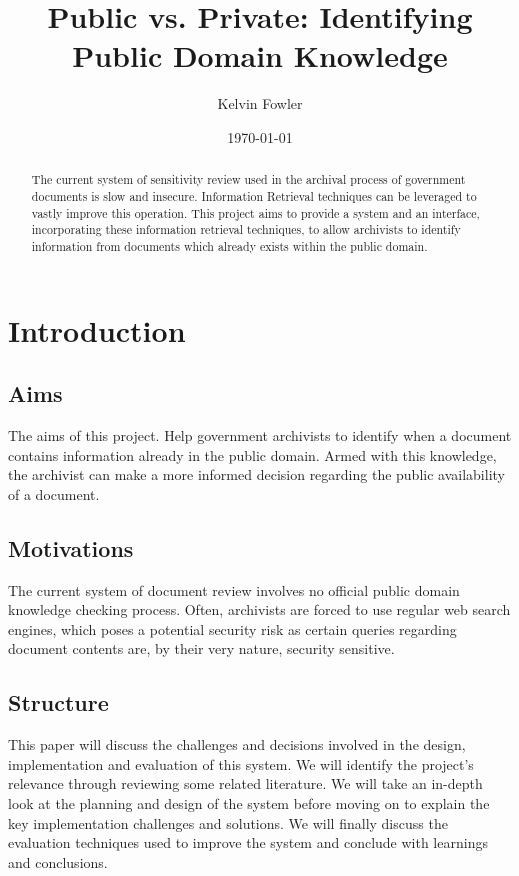 \documentclass{l4proj}
\title{Public vs. Private: \newline Identifying Public Domain Knowledge}
\author{Kelvin Fowler}
\date{\today}
\begin{document}
\maketitle

\begin{abstract}
The current system of sensitivity review used in the archival process of government documents is slow and insecure. Information Retrieval techniques can be leveraged to vastly improve this operation. This project aims to provide a system and an interface, incorporating these information retrieval techniques, to allow archivists to identify information from documents which already exists within the public domain.
\end{abstract}


\educationalconsent

\tableofcontents

\chapter{Introduction}

\section{Aims}
The aims of this project.
Help government archivists to identify when a document contains information already in the public domain. Armed with this knowledge, the archivist can make a more informed decision regarding the public availability of a document.

\section{Motivations}
The current system of document review involves no official public domain knowledge checking process. Often, archivists are forced to use regular web search engines, which poses a potential security risk as certain queries regarding document contents are, by their very nature, security sensitive.

\section{Structure}
This paper will discuss the challenges and decisions involved in the design, implementation and evaluation of this system. We will identify the project's relevance through reviewing some related literature. We will take an in-depth look at the planning and design of the system before moving on to explain the key implementation challenges and solutions.
We will finally discuss the evaluation techniques used to improve the system and conclude with learnings and conclusions.
\end{document}

